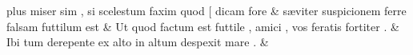 \documentclass[12pt,onecolumn,twoside,a4paper]{memoir}
\begin{document}
\begin{pairs}
\begin{Leftside}
                              plus
                              miser
                              sim
                              ,
                              si
                              scelestum
                              faxim
                              quod
                              [
                              dicam
                              fore \&
                         \stanza {}
                     sæviter
                              suspicionem
                              ferre
                              falsam
                              futtilum
                              est \&
                         \stanza {}
                     Ut
                              quod
                              factum
                              est
                              futtile
                              ,
                              amici
                              ,
                              vos
                              feratis
                              fortiter
                              . \&
                         \stanza {}
                     Ibi
                              tum
                              derepente
                              ex
                              alto
                              in
                              altum
                              despexit
                              mare
                              . \&
                     
                  \endnumbering
		\end{Leftside}
                  \begin{Rightside}
			\beginnumbering
			\numberstanzafalse
                     

\end{Rightside}
\end{pairs}
\end{document}
